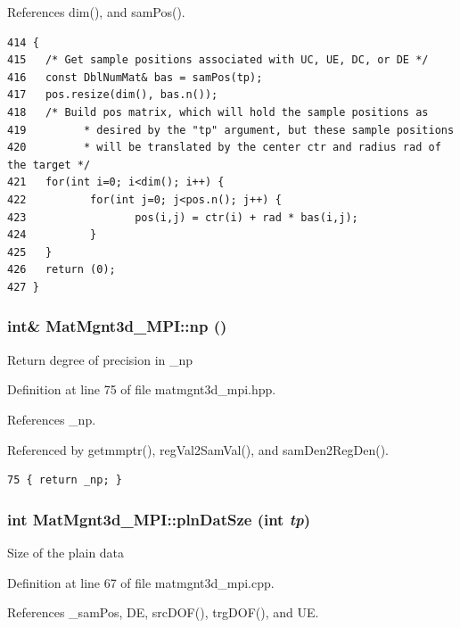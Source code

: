 References dim(), and sam\-Pos().

\footnotesize\begin{verbatim}414 {
415   /* Get sample positions associated with UC, UE, DC, or DE */
416   const DblNumMat& bas = samPos(tp);
417   pos.resize(dim(), bas.n());
418   /* Build pos matrix, which will hold the sample positions as
419         * desired by the "tp" argument, but these sample positions
420         * will be translated by the center ctr and radius rad of the target */
421   for(int i=0; i<dim(); i++) {
422          for(int j=0; j<pos.n(); j++) {
423                 pos(i,j) = ctr(i) + rad * bas(i,j);
424          }
425   }
426   return (0);
427 }
\end{verbatim}\normalsize 


\subsubsection{\setlength{\rightskip}{0pt plus 5cm}int\& Mat\-Mgnt3d\_\-MPI::np ()\hspace{0.3cm}{\tt  [inline]}}\label{classMatMgnt3d__MPI_79545716c1fbc95cbd811a65ffa9f767_79545716c1fbc95cbd811a65ffa9f767}


Return degree of precision in \_\-np 

Definition at line 75 of file matmgnt3d\_\-mpi.hpp.

References \_\-np.

Referenced by getmmptr(), reg\-Val2Sam\-Val(), and sam\-Den2Reg\-Den().

\footnotesize\begin{verbatim}75 { return _np; }
\end{verbatim}\normalsize 


\subsubsection{\setlength{\rightskip}{0pt plus 5cm}int Mat\-Mgnt3d\_\-MPI::pln\-Dat\-Sze (int {\em tp})}\label{classMatMgnt3d__MPI_7b6cc287face26f0d82bc4676e69fb83_7b6cc287face26f0d82bc4676e69fb83}


Size of the plain data 

Definition at line 67 of file matmgnt3d\_\-mpi.cpp.

References \_\-sam\-Pos, DE, src\-DOF(), trg\-DOF(), and UE.

